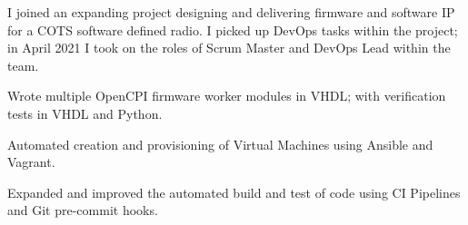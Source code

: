 {}
I joined an expanding project designing and delivering firmware and software IP for a COTS software defined radio. I picked up DevOps tasks within the project; in April 2021 I took on the roles of Scrum Master and DevOps Lead within the team.
\vspace{0.25em}
\begin{tightemize}
    \item Wrote multiple OpenCPI firmware worker modules in VHDL; with verification tests in VHDL and Python.
    \item Automated creation and provisioning of Virtual Machines using Ansible and Vagrant.
    \item Expanded and improved the automated build and test of code using CI Pipelines and Git pre-commit hooks.
\end{tightemize}
\sectionsep
